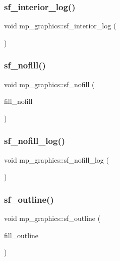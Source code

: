 \subsubsection{\texorpdfstring{sf\+\_\+interior\+\_\+log()}{sf\_interior\_log()}}
{\footnotesize\ttfamily void mp\+\_\+graphics\+::sf\+\_\+interior\+\_\+log (\begin{DoxyParamCaption}{ }\end{DoxyParamCaption})}

\mbox{\label{classmp__graphics_afeaff125b2f6ea3ca870ee238fd06b8b}} 
\subsubsection{\texorpdfstring{sf\+\_\+nofill()}{sf\_nofill()}}
{\footnotesize\ttfamily void mp\+\_\+graphics\+::sf\+\_\+nofill (\begin{DoxyParamCaption}\item[{\mbox{\hyperlink{galois_8h_a09fddde158a3a20bd2dcadb609de11dc}{I\+NT}}}]{fill\+\_\+nofill }\end{DoxyParamCaption})}

\mbox{\label{classmp__graphics_aaf8c6cceb1227281515b288177e9bd28}} 
\subsubsection{\texorpdfstring{sf\+\_\+nofill\+\_\+log()}{sf\_nofill\_log()}}
{\footnotesize\ttfamily void mp\+\_\+graphics\+::sf\+\_\+nofill\+\_\+log (\begin{DoxyParamCaption}{ }\end{DoxyParamCaption})}

\mbox{\label{classmp__graphics_a90932e2699b9787306763eca27b250fa}} 
\subsubsection{\texorpdfstring{sf\+\_\+outline()}{sf\_outline()}}
{\footnotesize\ttfamily void mp\+\_\+graphics\+::sf\+\_\+outline (\begin{DoxyParamCaption}\item[{\mbox{\hyperlink{galois_8h_a09fddde158a3a20bd2dcadb609de11dc}{I\+NT}}}]{fill\+\_\+outline }\end{DoxyParamCaption})}

